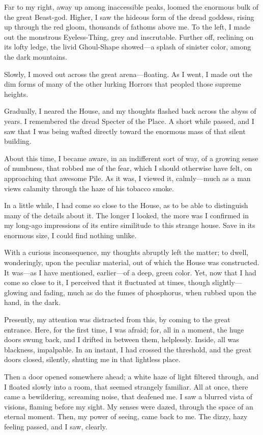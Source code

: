 Far to my right, away up among inaccessible peaks, loomed the enormous bulk of the great Beast-god. Higher, I saw the hideous form of the dread goddess, rising up through the red gloom, thousands of fathoms above me. To the left, I made out the monstrous Eyeless-Thing, grey and inscrutable. Further off, reclining on its lofty ledge, the livid Ghoul-Shape showed---a splash of sinister color, among the dark mountains.

Slowly, I moved out across the great arena---floating. As I went, I made out the dim forms of many of the other lurking Horrors that peopled those supreme heights.

Gradually, I neared the House, and my thoughts flashed back across the abyss of years. I remembered the dread Specter of the Place. A short while passed, and I saw that I was being wafted directly toward the enormous mass of that silent building.

About this time, I became aware, in an indifferent sort of way, of a growing sense of numbness, that robbed me of the fear, which I should otherwise have felt, on approaching that awesome Pile. As it was, I viewed it, calmly---much as a man views calamity through the haze of his tobacco smoke.

In a little while, I had come so close to the House, as to be able to distinguish many of the details about it. The longer I looked, the more was I confirmed in my long-ago impressions of its entire similitude to this strange house. Save in its enormous size, I could find nothing unlike.

With a curious inconsequence, my thoughts abruptly left the matter; to dwell, wonderingly, upon the peculiar material, out of which the House was constructed. It was---as I have mentioned, earlier---of a deep, green color. Yet, now that I had come so close to it, I perceived that it fluctuated at times, though slightly---glowing and fading, much as do the fumes of phosphorus, when rubbed upon the hand, in the dark.

Presently, my attention was distracted from this, by coming to the great entrance. Here, for the first time, I was afraid; for, all in a moment, the huge doors swung back, and I drifted in between them, helplessly. Inside, all was blackness, impalpable. In an instant, I had crossed the threshold, and the great doors closed, silently, shutting me in that lightless place.

Then a door opened somewhere ahead; a white haze of light filtered through, and I floated slowly into a room, that seemed strangely familiar. All at once, there came a bewildering, screaming noise, that deafened me. I saw a blurred vista of visions, flaming before my sight. My senses were dazed, through the space of an eternal moment. Then, my power of seeing, came back to me. The dizzy, hazy feeling passed, and I saw, clearly.

\clearpage
